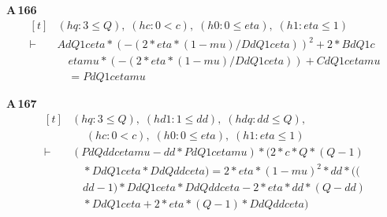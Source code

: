 \noindent\textbf{A\,166}\quad{}
{\footnotesize\[ \begin{aligned}[t]
&(\mathit{hq} : 3 \leq \mathit{Q}),\; (\mathit{hc} : 0 < \mathit{c}),\; (\mathit{h0} : 0 \leq \mathit{eta}),\; (\mathit{h1} : \mathit{eta} \leq 1)\\
\vdash\;&\mathit{Ad} \mathit{Q} 1 \mathit{c} \mathit{eta} * (-(2 * \mathit{eta} * (1 - \mathit{mu}) / \mathit{Dd} \mathit{Q} 1 \mathit{c} \mathit{eta})) ^{2} + 2 * \mathit{Bd} \mathit{Q} 1 \mathit{c}\\
&\quad \mathit{eta} \mathit{mu} * (-(2 * \mathit{eta} * (1 - \mathit{mu}) / \mathit{Dd} \mathit{Q} 1 \mathit{c} \mathit{eta})) + \mathit{Cd} \mathit{Q} 1 \mathit{c} \mathit{eta} \mathit{mu}\\
&\quad = \mathit{Pd} \mathit{Q} 1 \mathit{c} \mathit{eta} \mathit{mu}
\end{aligned} \]}

\noindent\textbf{A\,167}\quad{}
{\footnotesize\[ \begin{aligned}[t]
&(\mathit{hq} : 3 \leq \mathit{Q}),\; (\mathit{hd1} : 1 \leq \mathit{dd}),\; (\mathit{hdq} : \mathit{dd} \leq \mathit{Q}),\\
&\quad \; (\mathit{hc} : 0 < \mathit{c}),\; (\mathit{h0} : 0 \leq \mathit{eta}),\; (\mathit{h1} : \mathit{eta} \leq 1)\\
\vdash\;&(\mathit{Pd} \mathit{Q} \mathit{dd} \mathit{c} \mathit{eta} \mathit{mu} - \mathit{dd} * \mathit{Pd} \mathit{Q} 1 \mathit{c} \mathit{eta} \mathit{mu}) * (2 * \mathit{c} * \mathit{Q} * (\mathit{Q} - 1)\\
&\quad * \mathit{Dd} \mathit{Q} 1 \mathit{c} \mathit{eta} * \mathit{Dd} \mathit{Q} \mathit{dd} \mathit{c} \mathit{eta}) = 2 * \mathit{eta} * (1 - \mathit{mu}) ^{2} * \mathit{dd} * ((\\
&\quad \mathit{dd} - 1) * \mathit{Dd} \mathit{Q} 1 \mathit{c} \mathit{eta} * \mathit{Dd} \mathit{Q} \mathit{dd} \mathit{c} \mathit{eta} - 2 * \mathit{eta} * \mathit{dd} * (\mathit{Q} - \mathit{dd})\\
&\quad * \mathit{Dd} \mathit{Q} 1 \mathit{c} \mathit{eta} + 2 * \mathit{eta} * (\mathit{Q} - 1) * \mathit{Dd} \mathit{Q} \mathit{dd} \mathit{c} \mathit{eta})
\end{aligned} \]}

